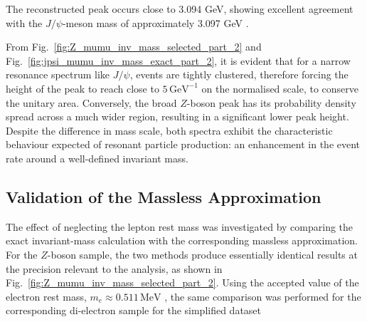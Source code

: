 \documentclass[11pt, a4paper]{article}
\numberwithin{equation}{section}
\begin{document}
The reconstructed peak occurs close to 3.094 GeV, showing excellent agreement with the $J/\psi$-meson mass of approximately 3.097 GeV \cite{pdgtakahashijpsi2026review}.

From Fig.~\ref{fig:Z_mumu_inv_mass_selected_part_2} and Fig.~\ref{fig:jpsi_mumu_inv_mass_exact_part_2}, it is evident that for a narrow resonance spectrum like $J/\psi$, events are tightly clustered, therefore forcing the height of the peak to reach close to $5 \, \text{GeV}^{-1}$ on the normalised scale, to conserve the unitary area. Conversely, the broad $Z$-boson peak has its probability density spread across a much wider region, resulting in a significant lower peak height. Despite the difference in mass scale, both spectra exhibit the characteristic behaviour expected of resonant particle production: an enhancement in the event rate around a well-defined invariant mass. 

\FloatBarrier
\subsection{Validation of the Massless Approximation}

The effect of neglecting the lepton rest mass was investigated by comparing the exact invariant-mass calculation with the corresponding massless approximation. For the $Z$-boson sample, the two methods produce essentially identical results at the precision relevant to the analysis, as shown in Fig.~\ref{fig:Z_mumu_inv_mass_selected_part_2}. Using the accepted value of the electron rest mass, $m_e \approx 0.511 \, \text{MeV}$ \cite{nist2022electronmass}, the same comparison was performed for the corresponding di-electron sample for the simplified dataset
\end{document}
